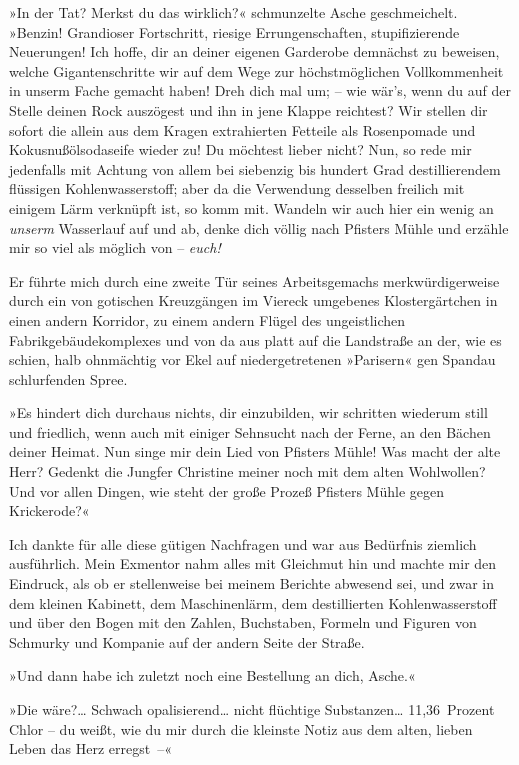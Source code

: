 »In der Tat? Merkst du das wirklich?« schmunzelte Asche
geschmeichelt. »Benzin! Grandioser Fortschritt, riesige
Errungenschaften, stupifizierende Neuerungen! Ich hoffe, dir an
deiner eigenen Garderobe demnächst zu beweisen, welche
Gigantenschritte wir auf dem Wege zur höchstmöglichen
Vollkommenheit in unserm Fache gemacht haben! Dreh dich mal um; –
wie wär's, wenn du auf der Stelle deinen Rock auszögest und ihn in
jene Klappe reichtest? Wir stellen dir sofort die allein aus dem
Kragen extrahierten Fetteile als Rosenpomade und
Kokusnußölsodaseife wieder zu! Du möchtest lieber nicht? Nun, so
rede mir jedenfalls mit Achtung von allem bei siebenzig bis hundert
Grad destillierendem flüssigen Kohlenwasserstoff; aber da die
Verwendung desselben freilich mit einigem Lärm verknüpft ist, so
komm mit. Wandeln wir auch hier ein wenig an \emph{unserm}
Wasserlauf auf und ab, denke dich völlig nach Pfisters Mühle und
erzähle mir so viel als möglich von – \emph{euch!}

Er führte mich durch eine zweite Tür seines Arbeitsgemachs
merkwürdigerweise durch ein von gotischen Kreuzgängen im Viereck
umgebenes Klostergärtchen in einen andern Korridor, zu einem andern
Flügel des ungeistlichen Fabrikgebäudekomplexes und von da aus
platt auf die Landstraße an der, wie es schien, halb ohnmächtig vor
Ekel auf niedergetretenen »Parisern« gen Spandau schlurfenden
Spree.

»Es hindert dich durchaus nichts, dir einzubilden, wir schritten
wiederum still und friedlich, wenn auch mit einiger Sehnsucht nach
der Ferne, an den Bächen deiner Heimat. Nun singe mir dein Lied von
Pfisters Mühle! Was macht der alte Herr? Gedenkt die Jungfer
Christine meiner noch mit dem alten Wohlwollen? Und vor allen
Dingen, wie steht der große Prozeß Pfisters Mühle gegen
Krickerode?«

Ich dankte für alle diese gütigen Nachfragen und war aus Bedürfnis
ziemlich ausführlich. Mein Exmentor nahm alles mit Gleichmut hin
und machte mir den Eindruck, als ob er stellenweise bei meinem
Berichte abwesend sei, und zwar in dem kleinen Kabinett, dem
Maschinenlärm, dem destillierten Kohlenwasserstoff und über den
Bogen mit den Zahlen, Buchstaben, Formeln und Figuren von Schmurky
und Kompanie auf der andern Seite der Straße.

»Und dann habe ich zuletzt noch eine Bestellung an dich, Asche.«

»Die wäre?\ldots{} Schwach opalisierend\ldots{} nicht flüchtige Substanzen\ldots{}
11,36~Prozent Chlor – du weißt, wie du mir durch die kleinste Notiz
aus dem alten, lieben Leben das Herz erregst~–«


